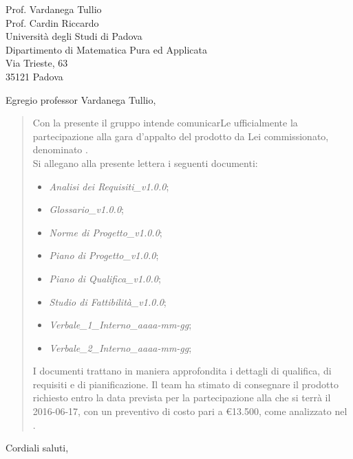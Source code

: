 \documentclass{letter}
\begin{document}

\begin{letter}{\hfill Prof. Vardanega Tullio \\
	\hfill Prof. Cardin Riccardo \\
	\hfill Università degli Studi di Padova \\
	\hfill Dipartimento di Matematica Pura ed Applicata \\
	\hfill Via Trieste, 63 \\
	\hfill 35121 Padova}

\date{}
\opening{Egregio professor Vardanega Tullio,}
 
	\begin{quotation}			
		Con la presente il gruppo \textit{\gruppo} intende comunicarLe ufficialmente la partecipazione alla gara d'appalto del prodotto da Lei commissionato, denominato \textbf{\progetto}.
		\\
		Si allegano alla presente lettera i seguenti documenti:
		\begin{itemize}
			\item \textit{Analisi dei Requisiti\_v1.0.0};
			\item \textit{Glossario\_v1.0.0};
			\item \textit{Norme di Progetto\_v1.0.0};
			\item \textit{Piano di Progetto\_v1.0.0};
			\item \textit{Piano di Qualifica\_v1.0.0};
			\item \textit{Studio di Fattibilità\_v1.0.0};
			\item \textit{Verbale\_1\_Interno\_aaaa-mm-gg};
			\item \textit{Verbale\_2\_Interno\_aaaa-mm-gg};
		\end{itemize}
		I documenti trattano in maniera approfondita i dettagli di qualifica, di requisiti e di pianificazione.	
		Il team ha stimato di consegnare il prodotto richiesto entro la data prevista per la partecipazione alla \textit{\RA} che si terrà il 2016-06-17, con un preventivo di costo pari a \euro13.500, come analizzato nel \textit{\PdP}.	
	\end{quotation}
	\closing{Cordiali saluti,}


\end{letter}
 
\end{document}
